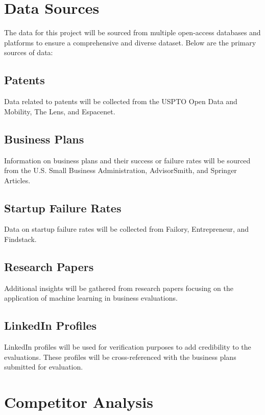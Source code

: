 \documentclass[12pt]{article}
\begin{document}
	
	
	\section{Data Sources}
	
	The data for this project will be sourced from multiple open-access databases and platforms to ensure a comprehensive and diverse dataset. Below are the primary sources of data:
	
	\subsection{Patents}
	Data related to patents will be collected from the USPTO Open Data and Mobility\cite{uspto}, The Lens\cite{thelens}, and Espacenet\cite{espacenet}.
	
	\subsection{Business Plans}
	Information on business plans and their success or failure rates will be sourced from the U.S. Small Business Administration\cite{sba}, AdvisorSmith\cite{advisorsmith}, and Springer Articles\cite{springer}.
	
	\subsection{Startup Failure Rates}
	Data on startup failure rates will be collected from Failory\cite{failory}, Entrepreneur\cite{entrepreneur}, and Findstack\cite{findstack}.
	
	\subsection{Research Papers}
	Additional insights will be gathered from research papers focusing on the application of machine learning in business evaluations\cite{researchpapers}.
	
	\subsection{LinkedIn Profiles}
	LinkedIn profiles will be used for verification purposes to add credibility to the evaluations. These profiles will be cross-referenced with the business plans submitted for evaluation.
	
	\section{Competitor Analysis}
	
\end{document}
